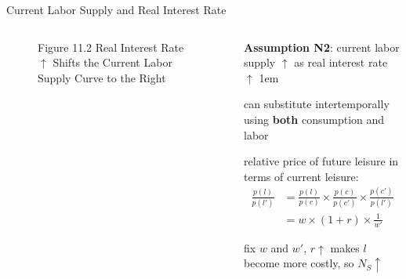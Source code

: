 \documentclass[11pt,aspectratio=43]{beamer}
\let\olditemize=\itemize
\let\endolditemize=\enditemize
\renewenvironment{itemize}{\olditemize \itemsep1em}{\endolditemize}
\theoremstyle{definition}
\begin{document}
\begin{frame}{Current Labor Supply and Real Interest Rate}
\label{slide:Current_Labor_Supply_and_Real_Interest_Rate}
    \begin{columns}
        \begin{column}{0.5\textwidth}
            \begin{figure}
                \caption{\scriptsize Figure 11.2  Real Interest Rate $ \uparrow  $ Shifts the Current Labor Supply Curve to the Right}
            \end{figure}
        \end{column}
        \begin{column}{0.5\textwidth}
            \textbf{Assumption N2}: current labor supply $ \uparrow  $ as real interest rate $ \uparrow  $
            \begin{itemize}
                \item can substitute \alert{intertemporally} using \textbf{both} consumption and labor
                \item \alert{relative price of future leisure in terms of current leisure}:
                    \begin{align*}
                        \frac{p( l )}{p( l' )}
                            & = \frac{p( l )}{p( c )} \times \frac{p( c )}{p( c' )} \times \frac{p( c' )}{p( l' )}
                        \\
                            & = w \times ( 1+r ) \times \frac{1}{w'}
                    \end{align*}
                \item fix $ w $ and $ w' $, $ r \uparrow  $ makes $ l $ become more costly, so $ N_{S} \uparrow  $
            \end{itemize}
        \end{column}
    \end{columns}
\end{frame}
\end{document}
